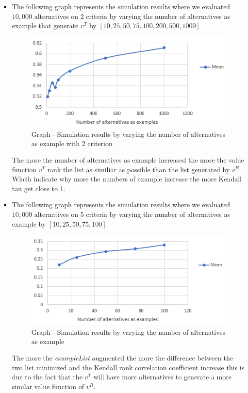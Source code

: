 \documentclass{report}
\begin{document}
\begin{itemize}
\item The following graph represents the simulation results where we evaluated $10,000$ alternatives on 2 criteria by varying the number of alternatives as example that generate $v^T$ by $[10, 25, 50, 75, 100, 200, 500, 1000]$ 
\begin{figure}[H]
\centering
\includegraphics[keepaspectratio]{graph-04.PNG}
\caption{Graph - Simulation results by varying the number of alternatives as example with 2 criterion}
\end{figure}
The more the number of alternatives as example increased the more the value function $v^T$  rank the list as similiar  as possible than the list generated by $v^R$. Whcih indicate why more the numbers of example increase the more  Kendall tau get close to 1. \\
\newpage
\item The following graph represents the simulation results where we evaluated $10,000$ alternatives on 5 criteria by varying the number of alternatives as example by $[10, 25, 50, 75, 100]$ 
\begin{figure}[H]
\centering
\includegraphics[keepaspectratio]{graph-03.PNG}
\caption{Graph - Simulation results by varying the number of alternatives as example}
\end{figure}
The more the \textit{exampleList} augmented the more the difference between the two list minimized and the Kendall rank correlation coefficient increase this is due to the fact that the $v^T$ will have more alternatives to generate a more similar value function of $v^R$.
\end{itemize}
\end{document}
